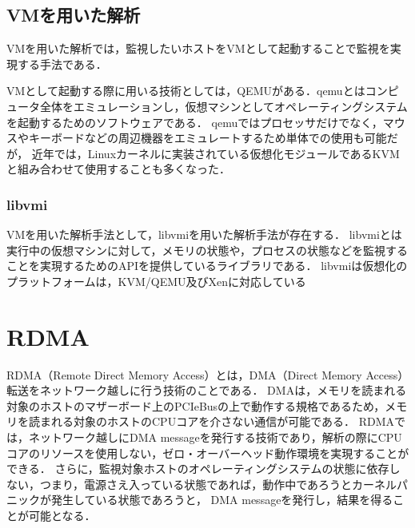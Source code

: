 \subsection{VMを用いた解析}

VMを用いた解析では，監視したいホストをVMとして起動することで監視を実現する手法である．

VMとして起動する際に用いる技術としては，QEMU\cite{qemu}がある．qemuとはコンピュータ全体をエミュレーションし，仮想マシンとしてオペレーティングシステムを起動するためのソフトウェアである．
qemuではプロセッサだけでなく，マウスやキーボードなどの周辺機器をエミュレートするため単体での使用も可能だが，
近年では，Linuxカーネルに実装されている仮想化モジュールであるKVM\cite{kvm}と組み合わせて使用することも多くなった．



\subsubsection{libvmi}

VMを用いた解析手法として，libvmi\cite{osti_1334968}を用いた解析手法が存在する．
libvmiとは実行中の仮想マシンに対して，メモリの状態や，プロセスの状態などを監視することを実現するためのAPIを提供しているライブラリである．
libvmiは仮想化のプラットフォームは，KVM/QEMU及びXenに対応している


\section{RDMA}

RDMA（Remote Direct Memory Access）とは，DMA（Direct Memory Access）\cite{amini1995system}転送をネットワーク越しに行う技術のことである．
DMAは，メモリを読まれる対象のホストのマザーボード上のPCIeBusの上で動作する規格であるため，メモリを読まれる対象のホストのCPUコアを介さない通信が可能である．
RDMAでは，ネットワーク越しにDMA messageを発行する技術であり，解析の際にCPUコアのリソースを使用しない，ゼロ・オーバーヘッド動作環境を実現することができる．
さらに，監視対象ホストのオペレーティングシステムの状態に依存しない，つまり，電源さえ入っている状態であれば，動作中であろうとカーネルパニックが発生している状態であろうと，
DMA messageを発行し，結果を得ることが可能となる．

